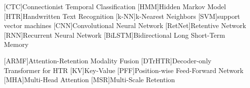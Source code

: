 [CTC]{Connectionist Temporal Classification}
[HMM]{Hidden Markov Model}
[HTR]{Handwritten Text Recognition}
[k-NN]{k-Nearest Neighbors}
[SVM]{support vector machines}
[CNN]{Convolutional Neural Network}
[RetNet]{Retentive Network}
[RNN]{Recurrent Neural Network}
[BiLSTM]{Bidirectional Long Short-Term Memory}

[ARMF]{Attention-Retention Modality Fusion}
[DTrHTR]{Decoder-only Transformer for HTR}
[KV]{Key-Value}
[PFF]{Position-wise Feed-Forward Network}
[MHA]{Multi-Head Attention}
[MSR]{Multi-Scale Retention}